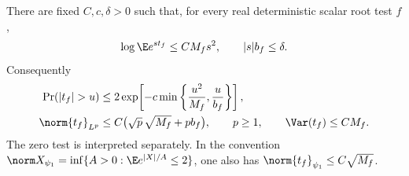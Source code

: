 \begin{theorem}
\label{ww:theorem}
There are fixed $C,c,\delta>0$ such that, for every real deterministic scalar root test $f$,
\begin{equation}
 \log\E e^{s t_f}\le CM_fs^2,
 \qquad |s|b_f\le\delta.
 \label{ww:mgf}
\end{equation}
Consequently
\begin{align}
 \Pr(|t_f|>u)&\le
 2\exp\!\left[-c\min\left\{\frac{u^2}{M_f},\frac{u}{b_f}\right\}\right],
 \label{ww:tail}\\
 \norm{t_f}_{L^p}&\le C\bigl(\sqrt p\,\sqrt{M_f}+p b_f\bigr),
 \qquad p\ge1,\qquad
 \Var(t_f)\le CM_f.
 \label{ww:moments}
\end{align}
The zero test is interpreted separately. In the convention
$\norm X_{\psi_1}=\inf\{A>0:\E e^{|X|/A}\le2\}$, one also has
$\norm{t_f}_{\psi_1}\le C\sqrt{M_f}$.
\end{theorem}

